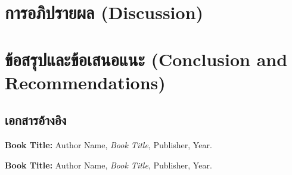 \documentclass[a4paper,12pt]{extarticle}
\begin{document}
\section{}

\newpage

\section{}

\newpage

\section{}

\newpage

\section{การอภิปรายผล (Discussion)}

\newpage

\section{ข้อสรุปและข้อเสนอแนะ (Conclusion and Recommendations)}

\newpage

\begin{center}
\section*{เอกสารอ้างอิง}
\end{center}

	\begin{enumerate} [label={[\arabic*]}]
		\item \textbf{Book Title:} Author Name, \textit{Book Title}, Publisher, Year. \label{book:example1}
		\item \textbf{Book Title:} Author Name, \textit{Book Title}, Publisher, Year. \label{book:example2}
	\end{enumerate}
\end{document}
